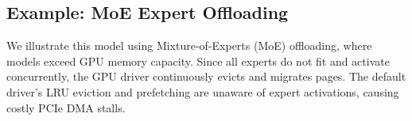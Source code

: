 \subsection{Example: MoE Expert Offloading}

We illustrate this model using Mixture-of-Experts (MoE) offloading, where models exceed GPU memory capacity.
Since all experts do not fit and activate concurrently, the GPU driver continuously evicts and migrates pages.
The default driver's LRU eviction and prefetching are unaware of expert activations, causing costly PCIe DMA stalls.

